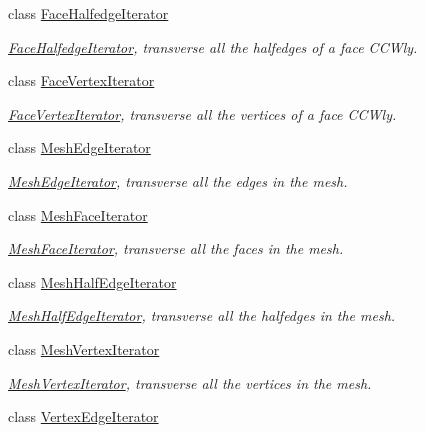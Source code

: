 \begin{DoxyCompactItemize}
class \hyperlink{class_mesh_lib_1_1_face_halfedge_iterator}{Face\+Halfedge\+Iterator}
\begin{DoxyCompactList}\small\item\em \hyperlink{class_mesh_lib_1_1_face_halfedge_iterator}{Face\+Halfedge\+Iterator}, transverse all the halfedges of a face C\+C\+Wly. \end{DoxyCompactList}\item 
class \hyperlink{class_mesh_lib_1_1_face_vertex_iterator}{Face\+Vertex\+Iterator}
\begin{DoxyCompactList}\small\item\em \hyperlink{class_mesh_lib_1_1_face_vertex_iterator}{Face\+Vertex\+Iterator}, transverse all the vertices of a face C\+C\+Wly. \end{DoxyCompactList}\item 
class \hyperlink{class_mesh_lib_1_1_mesh_edge_iterator}{Mesh\+Edge\+Iterator}
\begin{DoxyCompactList}\small\item\em \hyperlink{class_mesh_lib_1_1_mesh_edge_iterator}{Mesh\+Edge\+Iterator}, transverse all the edges in the mesh. \end{DoxyCompactList}\item 
class \hyperlink{class_mesh_lib_1_1_mesh_face_iterator}{Mesh\+Face\+Iterator}
\begin{DoxyCompactList}\small\item\em \hyperlink{class_mesh_lib_1_1_mesh_face_iterator}{Mesh\+Face\+Iterator}, transverse all the faces in the mesh. \end{DoxyCompactList}\item 
class \hyperlink{class_mesh_lib_1_1_mesh_half_edge_iterator}{Mesh\+Half\+Edge\+Iterator}
\begin{DoxyCompactList}\small\item\em \hyperlink{class_mesh_lib_1_1_mesh_half_edge_iterator}{Mesh\+Half\+Edge\+Iterator}, transverse all the halfedges in the mesh. \end{DoxyCompactList}\item 
class \hyperlink{class_mesh_lib_1_1_mesh_vertex_iterator}{Mesh\+Vertex\+Iterator}
\begin{DoxyCompactList}\small\item\em \hyperlink{class_mesh_lib_1_1_mesh_vertex_iterator}{Mesh\+Vertex\+Iterator}, transverse all the vertices in the mesh. \end{DoxyCompactList}\item 
class \hyperlink{class_mesh_lib_1_1_vertex_edge_iterator}{Vertex\+Edge\+Iterator}

\end{DoxyCompactItemize}
